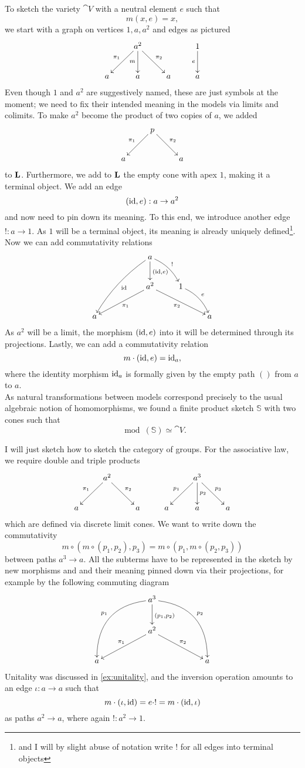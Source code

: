 \begin{Example}\label{ex:unitality}
To sketch the variety $\cat V$ with a neutral element $e$ such that
\[ m(x, e) = x, \]
we start with a graph on vertices $1, a, a^2$ and edges as pictured
\[
\xymatrix{
  & a^2 \ar[rd]^{\pi_2} \ar[d]_{m} \ar[ld]_{\pi_1} & & 1 \ar[d]_{e} \\
a & a & a & a
}\]
Even though $1$ and $a^2$ are suggestively named, these are just symbols at the moment; we need to fix their intended meaning in the models via limits and colimits. To make $a^2$ become the product of two copies of $a$, we added
\[
\xymatrix{
  & p \ar[rd]^{\pi_2} \ar[ld]_{\pi_1} & \\
a & & a
}\]
to $\textbf{L}$. Furthermore, we add to $\textbf{L}$ the empty cone with apex $1$, making it a terminal object. We add an edge
\[ (\textrm{id},e) : a \to a^2 \]
and now need to pin down its meaning. To this end, we introduce another edge $! : a \to 1$. As $1$ will be a terminal object, its meaning is already uniquely defined\footnote{and I will by slight abuse of notation write $!$ for all edges into terminal objects}. Now we can add commutativity relations
\[
\xymatrix{
  & & a \ar[d]^{(\id,e)} \ar@/_/[lldd]^{\id} \ar@/^/[rd]^{!}  & & \\
  & & a^2 \ar[lld]^{\pi_1} \ar[rrd]_{\pi_2} & 1 \ar@/^/[rd]^{e} & \\
a & & & & a
}\]
As $a^2$ will be a limit, the morphism $(\textrm{id},e)$ into it will be determined through its projections. Lastly, we can add a commutativity relation
\[ m \cdot (\textrm{id},e) = \textrm{id}_a, \]
where the identity morphism $\textrm{id}_a$ is formally given by the empty path $()$ from $a$ to $a$. \\

As natural transformations between models correspond precisely to the usual algebraic notion of homomorphisms, we found a finite product sketch $\mathbb S$ with two cones such that
\[ \mod(\mathbb S) \simeq \cat V. \]
\end{Example}

\begin{Example}[Groups]
I will just sketch how to sketch the category of groups. For the associative law, we require double and triple products
\[
\xymatrix{
  & a^2 \ar[ld]_{\pi_1} \ar[rd]^{\pi_2} &    & & a^3 \ar[ld]_{p_1} \ar[d]^{p_2} \ar[rd]^{p_3} & \\
a &     & a & a & a & a
}\]
which are defined via discrete limit cones. We want to write down the commutativity 
\[ m \circ (m \circ (p_1, p_2), p_3) = m \circ (p_1, m \circ (p_2,p_3)) \]
between paths $a^3 \to a$. All the subterms have to be represented in the sketch by new morphisms and and their meaning pinned down via their projections, for example by the following commuting diagram
\[
\xymatrix{
& & a^3 \ar[d]^{(p_1,p_2)} \ar@/_2pc/[lldd]_{p_1} \ar@/^2pc/[rrdd]^{p_2} & \\
& & a^2 \ar[lld]_{\pi_1} \ar[rrd]^{\pi_2} & \\
a & & & & a
}\]
Unitality was discussed in \ref{ex:unitality}, and the inversion operation amounts to an edge $\iota : a \to a$ such that \[ m \cdot (\iota, \textrm{id}) = e \cdot ! = m \cdot (\textrm{id}, \iota) \]
as paths $a^2 \to a$, where again $!: a^2 \to 1$. 
\end{Example}

